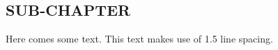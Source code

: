 \documentclass[fontsize=11pt]{scrartcl}
\begin{document}
\subsection{SUB-CHAPTER}
Here comes some text. This text makes use of 1.5 line spacing.  %
\pagebreak
% 
% 
\end{document}
